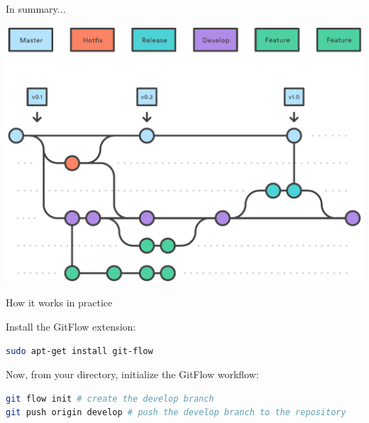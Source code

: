\documentclass{beamer}
\begin{document}
\begin{frame}{In summary...}

\begin{center}
\includegraphics[scale=0.5]{05-_2_.pdf}    
\end{center}

\end{frame}    

\begin{frame}[fragile]{How it works in practice}

Install the GitFlow extension:

\begin{lstlisting}[language=bash]
sudo apt-get install git-flow
\end{lstlisting}

\vspace{1em}
Now, from your directory, initialize the GitFlow workflow:

\begin{lstlisting}[language=bash]
git flow init # create the develop branch
git push origin develop # push the develop branch to the repository
\end{lstlisting}

\end{frame}
\end{document}
